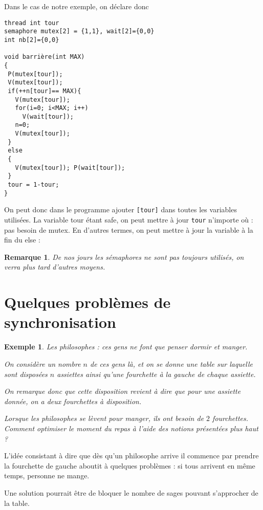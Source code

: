\documentclass[12pt,a4paper]{report}
\newtheorem*{rem}{Remarque}
\newtheorem*{ex}{Exemple}
\begin{document}
\bigskip

Dans le cas de notre exemple, on déclare donc


\begin{verbatim}
thread int tour
semaphore mutex[2] = {1,1}, wait[2]={0,0}
int nb[2]={0,0}

void barrière(int MAX)
{
 P(mutex[tour]);
 V(mutex[tour]);
 if(++n[tour]== MAX){
   V(mutex[tour]);
   for(i=0; i<MAX; i++) 
     V(wait[tour]);
   n=0;
   V(mutex[tour]);
 }
 else
 {
   V(mutex[tour]); P(wait[tour]);
 }
 tour = 1-tour;
}

\end{verbatim}

On peut donc dans le programme ajouter \verb?[tour]? dans toutes les variables utilisées. 
La variable tour étant \og safe\fg{}, on peut mettre à jour \verb?tour? n'importe où : pas besoin de mutex. En d'autres termes, on peut mettre à jour la variable à la fin du else :



\begin{rem}
De nos jours les sémaphores ne sont pas toujours utilisés, on verra plus tard d'autres moyens.  
\end{rem}

\section{Quelques problèmes de synchronisation}
\begin{ex}
  Les philosophes : ces gens ne font que penser dormir et manger.

On considère un nombre $n$ de ces gens là, et on se donne une table sur laquelle sont disposées
$n$ assiettes ainsi qu'une fourchette à la gauche de chaque assiette.

On remarque donc que cette disposition revient à dire que pour une assiette donnée, on a deux fourchettes à disposition.

Lorsque les philosophes se lèvent pour manger, ils ont besoin de $2$ fourchettes. Comment optimiser le moment du repas à l'aide des notions présentées plus haut ?
\end{ex}

\medskip

L'idée consistant à dire que dès qu'un philosophe arrive il commence par prendre la fourchette de gauche aboutit à quelques problèmes : si tous arrivent en même temps, personne ne mange.

Une solution pourrait être de bloquer le nombre de sages pouvant s'approcher de la table.
\end{document}

